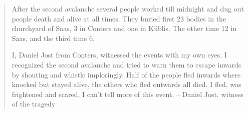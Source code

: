 \documentclass[12pt, a4paper]{article}
\begin{document}
\begin{quote}
After the second avalanche several people worked till midnight and dug out people death and alive at all times. They buried first 23 bodies in the churchyard of Saas, 3 in Conters and one in Küblis. The other time 12 in Saas, and the third time 6. 

I, Daniel Jost from Conters, witnessed the events with my own eyes. I recognized the second avalanche and tried to warn them to escape inwards by shouting and whistle imploringly. Half of the people fled inwards where knocked but stayed alive, the others who fled outwards all died. I fled, was frightened and scared, I can't tell more of this event.
 -- Daniel Jost, witness of the tragedy \cite[p.~50]{hansemann1995saaser}
\end{quote}


 \citep[p.~99]{pfister2002tag}



\end{document}
